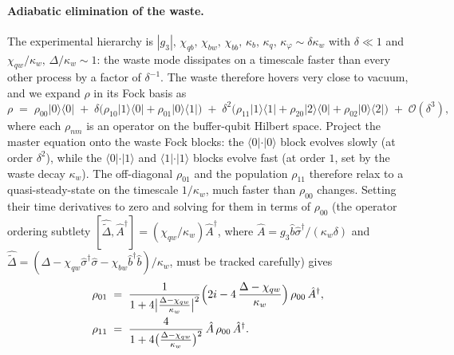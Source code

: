 \paragraph{Adiabatic elimination of the waste.}
The experimental hierarchy is
$|g_3|,\,\chi_{qb},\,\chi_{bw},\,\chi_{bb},\,\kappa_b,\,\kappa_q,\,\kappa_\varphi
\sim \delta\kappa_w$ with $\delta\ll 1$ and
$\chi_{qw}/\kappa_w,\,\Delta/\kappa_w\sim 1$: the waste mode dissipates
on a timescale faster than every other process by a factor of
$\delta^{-1}$. The waste therefore hovers very close to vacuum, and
we expand $\rho$ in its Fock basis as
\begin{equation}
\label{eq:lescanne-rho-ansatz}
\rho \;=\; \rho_{00}|0\rangle\!\langle 0|
\;+\; \delta\bigl(\rho_{10}|1\rangle\!\langle 0|+\rho_{01}|0\rangle\!\langle 1|\bigr)
\;+\; \delta^2\bigl(\rho_{11}|1\rangle\!\langle 1|+\rho_{20}|2\rangle\!\langle 0|+\rho_{02}|0\rangle\!\langle 2|\bigr)
\;+\; \mathcal O(\delta^3),
\end{equation}
where each $\rho_{nm}$ is an operator on the buffer-qubit Hilbert
space. Project the master equation onto the waste Fock blocks: the
$\langle 0|\cdot|0\rangle$ block evolves slowly (at order $\delta^2$),
while the $\langle 0|\cdot|1\rangle$ and $\langle 1|\cdot|1\rangle$
blocks evolve fast (at order $1$, set by the waste decay $\kappa_w$).
The off-diagonal $\rho_{01}$ and the population $\rho_{11}$ therefore
relax to a quasi-steady-state on the timescale $1/\kappa_w$, much
faster than $\rho_{00}$ changes. Setting their time derivatives to
zero and solving for them in terms of $\rho_{00}$ (the operator
ordering subtlety $[\hat{\tilde\Delta},\hat A^\dagger]=(\chi_{qw}/\kappa_w)\hat A^\dagger$,
where $\hat A=g_3\hat b\hat\sigma^\dagger/(\kappa_w\delta)$ and
$\hat{\tilde\Delta}=(\Delta-\chi_{qw}\hat\sigma^\dagger\hat\sigma-\chi_{bw}\hat b^\dagger\hat b)/\kappa_w$,
must be tracked carefully) gives
\begin{align}
\label{eq:lescanne-rho01}
\rho_{01} &\;=\; \frac{1}{1+4\bigl|\tfrac{\Delta-\chi_{qw}}{\kappa_w}\bigr|^2}
\Bigl(2i - 4\,\frac{\Delta-\chi_{qw}}{\kappa_w}\Bigr)\,\rho_{00}\,\hat A^\dagger,\\
\label{eq:lescanne-rho11}
\rho_{11} &\;=\; \frac{4}{1+4\bigl(\tfrac{\Delta-\chi_{qw}}{\kappa_w}\bigr)^2}\,\hat A\,\rho_{00}\,\hat A^\dagger.
\end{align}

